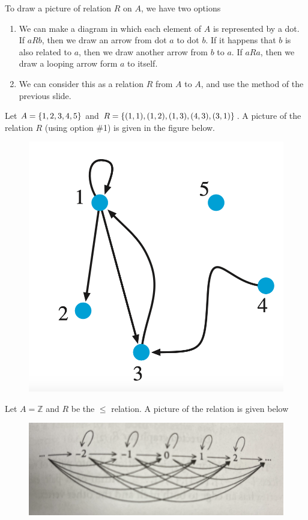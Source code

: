 \documentclass[10pt]{beamer}
\begin{document}
\begin{frame}

\begin{myredbox}[title=Drawing relations on $A$]
 To draw a picture of relation $R$ on $A$, we have two options
 \begin{enumerate}
  	\item We can make a diagram in which each element of $A$ is represented by a dot.  If $aRb$, then we draw an arrow from dot $a$ to dot $b$.  If it happens that $b$ is also related to $a$, then we draw another arrow from $b$ to $a$. If $aRa$, then we draw a looping arrow form $a$ to itself.
 	\item We can consider this as a relation $R$ from $A$ to $A$, and use the method of the previous slide.
 \end{enumerate}
 \end{myredbox}
 
\begin{mygreenbox}[title=Example]
Let $A = \{ {1,2,3,4,5} \}$ and $R=\{ {(1,1), (1,2), (1,3), (4,3), (3,1)} \}$. A picture of the relation $R$ (using option \#1) is given in the figure below.  
 
 \begin{figure}
\includegraphics[width=.2\textwidth]{images/relations_on_A} 
\end{figure}

\end{mygreenbox}
 


\end{frame}



\begin{frame}

\begin{mygreenbox}[title=An Example Using a Set with Infinitely Many Elements]
Let $A = \mathbb{Z}$ and $R$ be the $\leq$ relation.  A picture of the relation is given below 
 \begin{figure}
\includegraphics[width=\textwidth]{images/leq} 
\end{figure}

\end{mygreenbox}
 \end{frame}
\end{document}
